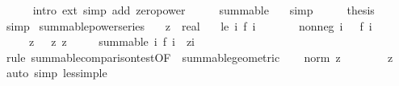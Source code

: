 \begin{isabellebody}
\ \ \ \ \isamarkupfalse%
\ {\isacharparenleft}{\kern0pt}intro\ ext{\isacharparenright}{\kern0pt}\ {\isacharparenleft}{\kern0pt}simp\ add{\isacharcolon}{\kern0pt}\ zero{\isacharunderscore}{\kern0pt}power{\isacharparenright}{\kern0pt}\isanewline
\ \ \isamarkupfalse%
\ \isamarkupfalse%
\ {\isachardoublequoteopen}summable\ {\isasymdots}{\isachardoublequoteclose}\ \isamarkupfalse%
\ simp\isanewline
\ \ \isamarkupfalse%
\ \isamarkupfalse%
\ {\isacharquery}{\kern0pt}thesis\ \isamarkupfalse%
\ simp\isanewline
{}\isamarkupfalse%
%
\endisatagproof
{\isafoldproof}%
%
\isadelimproof
\isanewline
%
\endisadelimproof
\isanewline
{}\isamarkupfalse%
\ summable{\isacharunderscore}{\kern0pt}power{\isacharunderscore}{\kern0pt}series{\isacharcolon}{\kern0pt}\isanewline
\ \ \ z\ {\isacharcolon}{\kern0pt}{\isacharcolon}{\kern0pt}\ real\isanewline
\ \ \ le{\isacharunderscore}{\kern0pt}{}{\isacharcolon}{\kern0pt}\ {\isachardoublequoteopen}{\isasymAnd}i{\isachardot}{\kern0pt}\ f\ i\ {\isasymle}\ {}{\isachardoublequoteclose}\isanewline
\ \ \ \ \ nonneg{\isacharcolon}{\kern0pt}\ {\isachardoublequoteopen}{\isasymAnd}i{\isachardot}{\kern0pt}\ {}\ {\isasymle}\ f\ i{\isachardoublequoteclose}\isanewline
\ \ \ \ \ z{\isacharcolon}{\kern0pt}\ {\isachardoublequoteopen}{}\ {\isasymle}\ z{\isachardoublequoteclose}\ {\isachardoublequoteopen}z\ {\isacharless}{\kern0pt}\ {}{\isachardoublequoteclose}\isanewline
\ \ \ {\isachardoublequoteopen}summable\ {\isacharparenleft}{\kern0pt}{\isasymlambda}i{\isachardot}{\kern0pt}\ f\ i\ {\isacharasterisk}{\kern0pt}\ z{\isacharcircum}{\kern0pt}i{\isacharparenright}{\kern0pt}{\isachardoublequoteclose}\isanewline
%
\isadelimproof
%
\endisadelimproof
%
\isatagproof
{}\isamarkupfalse%
\ {\isacharparenleft}{\kern0pt}rule\ summable{\isacharunderscore}{\kern0pt}comparison{\isacharunderscore}{\kern0pt}test{\isacharbrackleft}{\kern0pt}OF\ {\isacharunderscore}{\kern0pt}\ summable{\isacharunderscore}{\kern0pt}geometric{\isacharbrackright}{\kern0pt}{\isacharparenright}{\kern0pt}\isanewline
\ \ \isamarkupfalse%
\ {\isachardoublequoteopen}norm\ z\ {\isacharless}{\kern0pt}\ {}{\isachardoublequoteclose}\isanewline
\ \ \ \ \isamarkupfalse%
\ z\ \isamarkupfalse%
\ {\isacharparenleft}{\kern0pt}auto\ simp{\isacharcolon}{\kern0pt}\ less{\isacharunderscore}{\kern0pt}imp{\isacharunderscore}{\kern0pt}le{\isacharparenright}{\kern0pt}\isanewline

\end{isabellebody}
